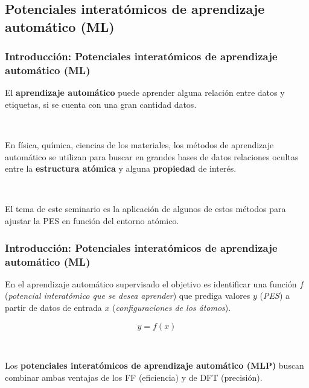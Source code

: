 \documentclass[aspectratio=169]{beamer}
\let\oldtextbf\textbf
\renewcommand{\textbf}[1]{\textcolor{nordblue}{\oldtextbf{#1}}}
\begin{document}
    \subsection{Potenciales interatómicos de aprendizaje automático (ML)}
    
    \begin{frame}
        \frametitle{Introducción: Potenciales interatómicos de aprendizaje 
        automático (ML)}


        El \textbf{aprendizaje automático} puede aprender alguna relación entre 
        datos y etiquetas, si se cuenta con una gran cantidad datos.

        \ \pause
    
        En física, química, ciencias de los materiales, los métodos de aprendizaje
        automático se utilizan para buscar en grandes bases de datos relaciones 
        ocultas entre la \textbf{estructura atómica} y alguna \textbf{propiedad}
        de interés.

        \ \pause

        El tema de este seminario es la aplicación de algunos de estos métodos
        para ajustar la PES en función del entorno atómico.

	\end{frame}
	
    \begin{frame}
        \frametitle{Introducción: Potenciales interatómicos de aprendizaje 
        automático (ML)}

        En el aprendizaje automático supervisado el objetivo es identificar una
        función $f$ (\textit{potencial interatómico que se desea aprender}) que
        prediga valores $y$ (\textit{PES}) a partir de datos de entrada $x$ 
        (\textit{configuraciones de los átomos}).
        
        $$
        y = f(x)
        $$

        \ \pause
        
        Los \textbf{potenciales interatómicos de aprendizaje automático (MLP)} 
        buscan combinar ambas ventajas de los FF (eficiencia) y de DFT 
        (precisión).

	\end{frame}
    
\end{document}
